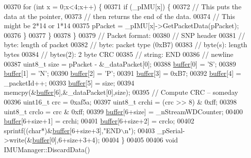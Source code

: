 \begin{DoxyCode}
{00370         \textcolor{keywordflow}{for} (\textcolor{keywordtype}{int} x = 0;x<4;x++) \{
00371             \textcolor{keywordflow}{if} (\_pIMU[x]) \{
00372                 \textcolor{comment}{// This puts the data at the pointer,}
00373                 \textcolor{comment}{// then returns the end of the data.}
00374                 \textcolor{comment}{// This might be 2*14 or 1*14}
00375                 pPacket = \_pIMU[x]->GetPacketData(pPacket);
00376             \}
00377         \}
00378     \}
00379     \textcolor{comment}{// Packet format:}
00380     \textcolor{comment}{// SNP header}
00381     \textcolor{comment}{// byte: length of packet}
00382     \textcolor{comment}{// byte: packet type (0xB7)}
00383     \textcolor{comment}{// byte(s): length bytes}
00384     \textcolor{comment}{// bytes(2): 2 byte CRC}
00385     \textcolor{comment}{// string: END}
00386     \textcolor{comment}{// newline}
00387     uint8\_t size = pPacket - &\_dataPacket[0];
00388     \hyperlink{_i_m_u_manager_8cpp_a858e0513a46bec1d794f9487c41a969d}{buffer}[0] = \textcolor{charliteral}{'S'};
00389     \hyperlink{_i_m_u_manager_8cpp_a858e0513a46bec1d794f9487c41a969d}{buffer}[1] = \textcolor{charliteral}{'N'};
00390     \hyperlink{_i_m_u_manager_8cpp_a858e0513a46bec1d794f9487c41a969d}{buffer}[2] = \textcolor{charliteral}{'P'};
00391     \hyperlink{_i_m_u_manager_8cpp_a858e0513a46bec1d794f9487c41a969d}{buffer}[3] = 0xB7;
00392     \hyperlink{_i_m_u_manager_8cpp_a858e0513a46bec1d794f9487c41a969d}{buffer}[4] = \_packetId++;
00393     \hyperlink{_i_m_u_manager_8cpp_a858e0513a46bec1d794f9487c41a969d}{buffer}[5] = size;
00394     memcpy(&\hyperlink{_i_m_u_manager_8cpp_a858e0513a46bec1d794f9487c41a969d}{buffer}[6],&\_dataPacket[0],size);
00395     \textcolor{comment}{// Compute CRC -- someday}
00396     uint16\_t crc = 0xaf5a;
00397     uint8\_t crchi = (crc >> 8) & 0xff;
00398     uint8\_t crclo = crc & 0xff;
00399     \hyperlink{_i_m_u_manager_8cpp_a858e0513a46bec1d794f9487c41a969d}{buffer}[6+size]   = \_nStreamWDCounter;
00400     \hyperlink{_i_m_u_manager_8cpp_a858e0513a46bec1d794f9487c41a969d}{buffer}[6+size+1]   = crchi;
00401     \hyperlink{_i_m_u_manager_8cpp_a858e0513a46bec1d794f9487c41a969d}{buffer}[6+size+2] = crclo;
00402     sprintf((\textcolor{keywordtype}{char}*)&\hyperlink{_i_m_u_manager_8cpp_a858e0513a46bec1d794f9487c41a969d}{buffer}[6+size+3],\textcolor{stringliteral}{"END\(\backslash\)n"});
00403     \_pSerial->write(&\hyperlink{_i_m_u_manager_8cpp_a858e0513a46bec1d794f9487c41a969d}{buffer}[0],6+size+3+4);
00404 \}
00405 
00406 \textcolor{keywordtype}{void} IMUManager::DiscardData()
}
\end{DoxyCode}
